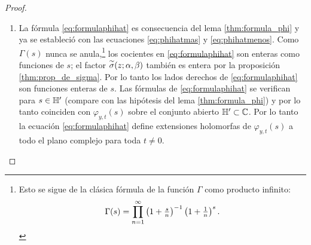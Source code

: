 \begin{proof}
\begin{enumerate}[label=\emph{\roman*})]
  Ahora probamos que la sucesi\'on $\{f_N(s)\}$ converge uniformemente sobre compactos para poder
  aplicar el teorema de Weierstrass y concluir que el l\'imite de las $f_N$'s, que es claramente
  $\varphi_{y,t}(s)$, es holomorfa sobre $\HH'$. Para esto, sea $Q\subset\HH'$ un compacto donde
  para toda $s\in Q$ existe una constante $\eps>0$ tal que $0<\eps<\Re(s)$. Con la aproximaci\'on
  \eqref{eq:approxdephi}, tenemos que para $N$ suficientemente grande, hay una constante positiva
  $M>0$ tal que
  \[
    \abs{\phi(x+iy;s)}\leq M\abs{x}^{-2\Re(s)-1}<M\abs{x}^{-2\eps-1}\qquad\forall |x|>N
  \]
  Por lo tanto, para $N$ suficientemente grande tenemos que:
  \begin{align*}
    \abs{\varphi_{y,t}(s)-f_N(s)}
    &=\abs{\int_{\abs{x}>N}\phi(x+iy;s)e^{-2\pi i tx}dx}\\
    &\leq\int_{\abs{x}>N}\abs{\phi(x+iy;s)}dx\\
    &< M \int_{\abs{x}>N}\abs{x}^{-2\eps-1}dx
      =M\int_{-\infty}^{-N}(-x)^{-2\eps-1}dx+M\int_{N}^{\infty}x^{-2\eps-1}dx\\
    &<\frac{M}{\eps N^{2\eps}}.
  \end{align*}
  Esta aproximaci\'on implica que la sucesi\'on $\{f_N(s)\}$ converge uniformemente a
  $\varphi_{y,t}(s)$ para toda $s\in Q$. Por el teorema de Weierstrass podemos concluir que
  $\varphi_{y,t}(s)$ es holomorfo sobre $\HH'$.

\item La f\'ormula \eqref{eq:formulaphihat} es consecuencia del lema \ref{thm:formula_phi}
  y ya se estableci\'o con las ecuaciones \eqref{eq:phihatmas} y \eqref{eq:phihatmenos}.
  Como $\Gamma(s)$ nunca se anula,\footnote{Esto se sigue de la cl\'asica f\'ormula de la
    funci\'on $\Gamma$ como producto infinito:
    $$\Gamma(s)=\prod_{n=1}^{\infty}\left( 1+\tfrac{s}{n} \right)^{-1}\left( 1+\tfrac{1}{n} \right)^s.$$}
  los cocientes en \eqref{eq:formulaphihat} son enteras como funciones de $s$; el factor
  $\overset{\sim}{\sigma}(z;\alpha,\beta)$ tambi\'en es entera por la proposici\'on \ref{thm:prop_de_sigma}.
  Por lo tanto los lados derechos de \eqref{eq:formulaphihat} son funciones enteras de $s$.
  Las f\'ormulas de \eqref{eq:formulaphihat} se verifican para $s\in\mathbb{H}'$ (compare con
  las hip\'otesis del lema \ref{thm:formula_phi}) y por lo tanto coinciden con
  $\varphi_{y,t}(s)$ sobre el conjunto abierto $\mathbb{H}'\subset\mathbb{C}$. Por lo tanto la
  ecuaci\'on \eqref{eq:formulaphihat} define extensiones holomorfas de $\varphi_{y,t}(s)$
  a todo el plano complejo para toda $t\neq0$. 


\end{enumerate}
\end{proof}
